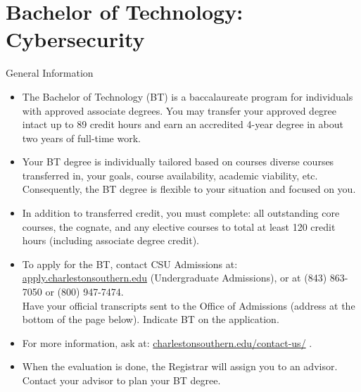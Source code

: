 %
\section*{Bachelor of Technology: Cybersecurity}

\begin{reqgroup}{General Information}
\begin{itemize}\small

	\item The Bachelor of Technology (BT) is a baccalaureate program for individuals with approved associate degrees. You may transfer your approved degree intact up to 89 credit hours and earn an accredited 4-year degree in about two years of full-time work.

	\item Your BT degree is individually tailored based on courses diverse courses transferred in, your goals, course availability, academic viability, etc. Consequently, the BT degree is flexible to your situation and focused on you.

	\item In addition to transferred credit, you must complete: all outstanding core courses, the cognate, and any elective courses to total at least 120 credit hours (including associate degree credit).

	\item To apply for the BT, contact CSU Admissions at:
		\href{https://apply.charlestonsouthern.edu/}{apply.charlestonsouthern.edu} (Undergraduate Admissions), or at (843) 863-7050 or (800) 947-7474.\\
		Have your official transcripts sent to the Office of Admissions (address at the bottom of the page below). Indicate BT on the application.

	\item For more information, ask at: \href{https://www.charlestonsouthern.edu/contact-us/}{charlestonsouthern.edu/contact-us/} .


	\item When the evaluation is done, the Registrar will assign you to an advisor. Contact your advisor to plan your BT degree.
\end{itemize}
\end{reqgroup}

